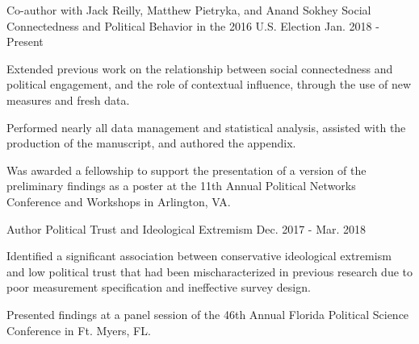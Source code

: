 \begin{cventries}
    \cventry
      {Co-author with Jack Reilly, Matthew Pietryka, and Anand Sokhey} %
      {Social Connectedness and Political Behavior in the 2016 U.S. Election} %
      {Jan. 2018 - Present} %
      {} %
      {
        \begin{cvitems} %
          \item {Extended previous work on the relationship between social connectedness and political engagement, and the role of contextual influence, through the use of new measures and fresh data.}
          \item {Performed nearly all data management and statistical analysis, assisted with the production of the manuscript, and authored the appendix.}
          \item {Was awarded a fellowship to support the presentation of a version of the preliminary findings as a poster at the 11th Annual Political Networks Conference and Workshops in Arlington, VA.}
        \end{cvitems}
      }



    \cventry
      {Author} %
      {Political Trust and Ideological Extremism} %
      {Dec. 2017 - Mar. 2018} %
      {} %
      {
        \begin{cvitems} %
          \item {Identified a significant association between conservative ideological extremism and low political trust that had been mischaracterized in previous research due to poor measurement specification and ineffective survey design.}
          \item {Presented findings at a panel session of the 46th Annual Florida Political Science Conference in Ft. Myers, FL.}
        \end{cvitems}
      }

\end{cventries}
